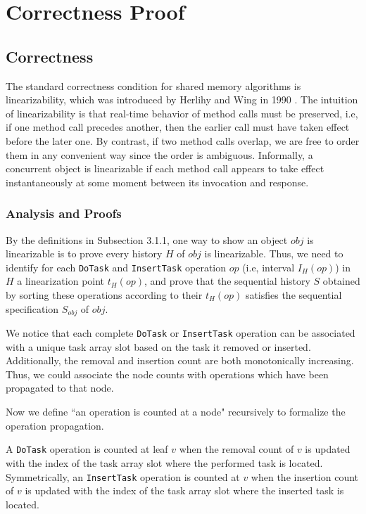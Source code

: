 \chapter{Correctness Proof}
\section{Correctness}
The standard correctness condition for shared memory algorithms is linearizability, which was introduced by Herlihy and Wing in 1990 \cite{Herlihy:1990:LCC:78969.78972}. The intuition of linearizability is that real-time behavior of method calls must be preserved, i.e, if one method call precedes another, then the earlier call must have taken effect before the later one. By contrast, if two method calls overlap, we are free to order them in any convenient way since the order is ambiguous. Informally, a concurrent object is linearizable if each method call appears to take effect instantaneously at some moment between its invocation and response.

\subsection{Analysis and Proofs}

By the definitions in Subsection 3.1.1, one way to show an object $obj$ is linearizable is to prove every history $H$ of $obj$ is linearizable. Thus, we need to identify for each \texttt{DoTask} and \texttt{InsertTask} operation $op$ (i.e, interval $I_H(op)$) in $H$ a linearization point $t_H(op)$, and prove that the sequential history $S$ obtained by sorting these operations according to their $t_H(op)$ satisfies the sequential specification  $S_{obj}$  of $obj$.

We notice that each complete \texttt{DoTask} or \texttt{InsertTask} operation can be associated with a unique task array slot based on the task it removed or inserted. Additionally, the removal and insertion count are both monotonically increasing. Thus, we could associate the node counts with operations which have been propagated to that node.

Now we define ``an operation is counted at a node" recursively to formalize the operation propagation.

A \texttt{DoTask} operation is counted at leaf $v$ when the removal count of $v$ is updated with the index of the task array slot where the performed task is located. Symmetrically, an \texttt{InsertTask} operation is counted at $v$ when the insertion count of $v$ is updated with the index of the task array slot where the inserted task is located.

